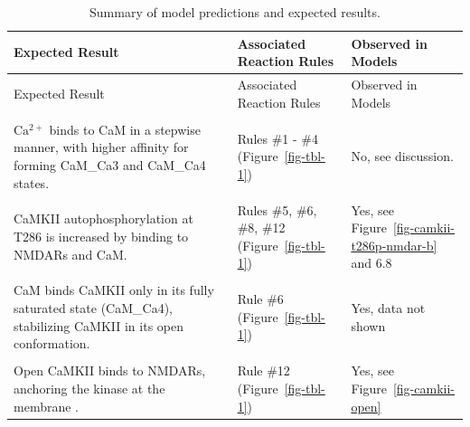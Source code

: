 \documentclass[
  11pt,
  letterpaper,
]{scrreprt}
\begin{document}
\begin{longtable}[]{@{}
  >{\raggedright\arraybackslash}p{}
  >{\raggedright\arraybackslash}p{}
  >{\raggedright\arraybackslash}p{}@{}}
\caption{Summary of model predictions and expected
results.}\label{tbl-model-predictions}\tabularnewline
\toprule\noalign{}
\begin{minipage}[b]{\linewidth}\raggedright
Expected Result
\end{minipage} & \begin{minipage}[b]{\linewidth}\raggedright
Associated Reaction Rules
\end{minipage} & \begin{minipage}[b]{\linewidth}\raggedright
Observed in Models
\end{minipage} \\
\midrule\noalign{}
\endfirsthead
\toprule\noalign{}
\begin{minipage}[b]{\linewidth}\raggedright
Expected Result
\end{minipage} & \begin{minipage}[b]{\linewidth}\raggedright
Associated Reaction Rules
\end{minipage} & \begin{minipage}[b]{\linewidth}\raggedright
Observed in Models
\end{minipage} \\
\midrule\noalign{}
\endhead
\bottomrule\noalign{}
\endlastfoot
& & \\
\(\mathrm{Ca^{2+}}\) binds to CaM in a stepwise manner, with higher
affinity for forming CaM\_Ca3 and CaM\_Ca4 states. & Rules \#1 - \#4
(Figure~\ref{fig-tbl-1}) & No, see discussion. \\
& & \\
CaMKII autophosphorylation at T286 is increased by binding to NMDARs and
CaM. & Rules \#5, \#6, \#8, \#12 (Figure~\ref{fig-tbl-1}) & Yes, see
Figure~\ref{fig-camkii-t286p-nmdar-b} and 6.8 \\
& & \\
CaM binds CaMKII only in its fully saturated state (CaM\_Ca4),
stabilizing CaMKII in its open conformation. & Rule \#6
(Figure~\ref{fig-tbl-1}) & Yes, data not shown \\
& & \\
Open CaMKII binds to NMDARs, anchoring the kinase at the membrane . &
Rule \#12 (Figure~\ref{fig-tbl-1}) & Yes, see
Figure~\ref{fig-camkii-open} \\

\end{longtable}
\end{document}
